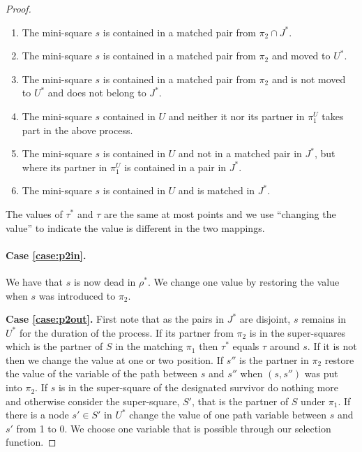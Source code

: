 \documentclass{theoretics}
\begin{document}
\begin{proof}
\begin{enumerate}

\item The mini-square $s$ is contained in a matched pair from $\pi_2 \cap J^*$. \label{case:p2in}

\item The mini-square $s$ is contained in a matched pair from $\pi_2$ and 
moved to $U^*$. \label{case:p2out}

\item The mini-square $s$ is contained in a matched pair from $\pi_2$ and 
is not moved to $U^*$ and does not belong to $J^*$. \label{case:p2outnot}

\item The mini-square $s$ contained in $U$ and neither it nor its
partner in $\pi_1^U$ takes part in the above process. \label{case:p1not}

\item The mini-square $s$ is contained in $U$ and not in a matched
pair in $J^*$, but where its partner in $\pi_1^U$ is contained in 
a pair in $J^*$. \label{case:p1notbutp}

\item The mini-square $s$ is contained in $U$ and is matched in $J^*$.
\label{case:p1yes}

\end{enumerate}

The values of $\tau^*$ and $\tau$ are the same at most points
and we use ``changing the value'' to indicate the value
is different in the two mappings.

\paragraph{Case \ref{case:p2in}.}  We have that $s$ is now dead in $\rho^*$.
We change one value by restoring the value when $s$ was
introduced to $\pi_2$.

\noindent
{\bf Case \ref{case:p2out}.}  First note that as the pairs
in $J^*$ are disjoint, $s$ remains in $U^*$ for the duration
of the process.  If its partner
from $\pi_2$ is in the super-squares which is the
partner of $S$ in the matching $\pi_1$
then $\tau^*$ equals $\tau$ around $s$.  If it is not then
we change the value at one or two position.
If $s''$ is the partner in $\pi_2$ restore the value of
the variable of the path between $s$ and $s''$ when
$(s,s'')$ was put into $\pi_2$.   If $s$ is in the super-square
of the designated survivor do nothing more and otherwise consider the
super-square, $S'$, that is the partner of $S$
under $\pi_1$.  If there is a node $s' \in S'$ in $U^*$
change the value of one path variable between $s$ and $s'$
from 1 to 0.  We choose one variable that is possible
through our selection function.


\end{proof}
\end{document}
